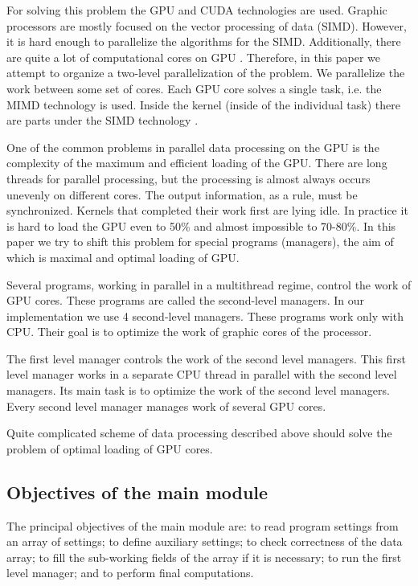 \documentclass{TAACpaper}
\begin{document}
For solving this problem the GPU and CUDA technologies are used. Graphic processors are mostly focused on the vector processing of data (SIMD). However, it is hard enough to parallelize the algorithms for the SIMD. Additionally, there are quite a lot of computational cores on GPU \cite{sanders2010Cuda}. Therefore, in this paper we attempt to organize a two-level parallelization of the problem. We parallelize the work between some set of cores. Each GPU core solves a single task, i.e. the MIMD technology is used. Inside the kernel (inside of the individual task) there are parts under the SIMD technology \cite{boreskov2012Cuda}.

One of the common problems in parallel data processing on the GPU is the complexity of the maximum and efficient loading of the GPU. There are long threads for parallel processing, but the processing is almost always occurs unevenly on different cores. The output information, as a rule, must be synchronized. Kernels that completed their work first are lying idle.  In practice it is hard to load the GPU even to 50\% and almost impossible to 70-80\%. In this paper we try to shift this problem for special programs (managers), the aim of which is maximal and optimal loading of GPU. 

Several programs, working in parallel in a multithread regime, control the work of GPU cores. These programs are called the second-level managers. In our implementation we use 4 second-level managers. These programs work only with CPU. Their goal is to optimize the work of graphic cores of the processor.

The first level manager controls the work of the second level managers. This first level manager works in a separate CPU thread in parallel with the second level managers. Its main task is to optimize the work of the second level managers. Every second level manager manages  work of several GPU cores.

Quite complicated scheme of data processing described above should solve the problem of optimal loading of GPU cores.

\subsection{Objectives of the main module}
The principal objectives of the main module are: to read program settings from an array of settings; to define auxiliary settings; to check correctness of the data array; to fill the sub-working fields of the array if it is necessary; to run the first level manager; and to perform final computations. 
\end{document}
